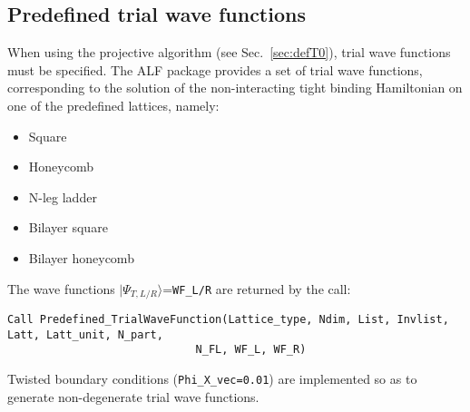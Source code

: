 

\subsection{Predefined trial wave functions} \label{sec:predefined_trial_wave_function}

When using the projective algorithm (see Sec.~\ref{sec:defT0}), trial wave functions must be specified.
The ALF package provides a set of trial wave functions, corresponding to the solution of the non-interacting tight binding Hamiltonian on one of the predefined lattices, namely:
\begin{itemize}
	\item Square
	\item Honeycomb
	\item N-leg ladder
	\item Bilayer square
	\item Bilayer honeycomb
\end{itemize}

The wave functions $|\Psi_{T,L/R}\rangle$=\texttt{WF\_L/R} are returned by the call:

\begin{lstlisting}[style=fortran]
Call Predefined_TrialWaveFunction(Lattice_type, Ndim, List, Invlist, Latt, Latt_unit, N_part,
                             N_FL, WF_L, WF_R)
\end{lstlisting}

Twisted boundary conditions (\texttt{Phi\_X\_vec=0.01}) are implemented so as to generate non-degenerate trial wave functions. 
